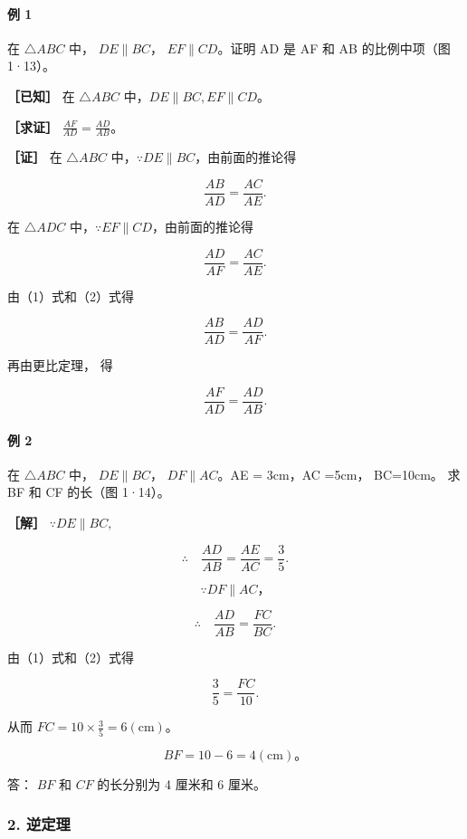 \paragraph{例 1}

在 \(\triangle ABC\) 中， \(DE \parallel BC\)，
\(EF \parallel CD\)。证明 AD 是 AF 和 AB 的比例中项（图 1·13）。

\textbf{［已知］} 在 \(\triangle ABC\)
中，\(DE \parallel BC, EF \parallel CD\)。

\textbf{［求证］} \(\frac{AF}{AD} = \frac{AD}{AB}\)。

\textbf{［证］} 在 \(\triangle ABC\)
中，\(\because DE \parallel BC\)，由前面的推论得

\[
\frac {A B}{A D} = \frac {A C}{A E}. \tag {1}
\]

在 \(\triangle ADC\) 中，\(\because EF \parallel CD\)，由前面的推论得

\[
\frac {A D}{A F} = \frac {A C}{A E}. \tag {2}
\]

由（1）式和（2）式得

\[
\frac {A B}{A D} = \frac {A D}{A F}.
\]

再由更比定理， 得

\[
\frac {A F}{A D} = \frac {A D}{A B}.
\]

\paragraph{例 2}

在 \(\triangle ABC\) 中， \(DE \parallel BC\)， \(DF \parallel AC\)。AE
= 3cm，AC =5cm， BC=10cm。 求 BF 和 CF 的长（图 1·14）。

\textbf{［解］} \(\because DE \parallel BC,\)

\[
\therefore \quad \frac {A D}{A B} = \frac {A E}{A C} = \frac {3}{5}. \tag {1}
\]

\[
\because D F \parallel A C\text{，}
\]

\[
\therefore \quad \frac {A D}{A B} = \frac {F C}{B C}. \tag {2}
\]

由（1）式和（2）式得

\[
\frac {3}{5} = \frac {F C}{10}.
\]

从而 \(FC = 10 \times \frac{3}{5} = 6(\mathrm{cm})\)。

\[
B F = 10 - 6 = 4 (\mathrm{cm})\text{。}
\]

答： \(BF\) 和 \(CF\) 的长分别为 4 厘米和 6 厘米。

\subsubsection{2. 逆定理}

